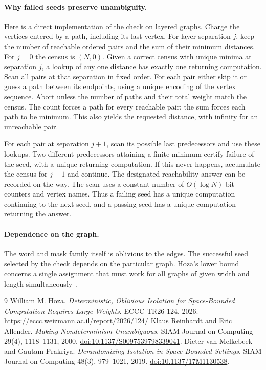 \documentclass[11pt]{article}
\begin{document}
\paragraph{Why failed seeds preserve unambiguity.}
Here is a direct implementation of the check on layered graphs. Charge
the vertices entered by a path, including its last vertex. For layer
separation $j$, keep the number of reachable ordered pairs and the sum
of their minimum distances. For $j=0$ the census is $(N,0)$.
Given a correct census with unique minima at separation $j$, a lookup
of any one distance has exactly one returning computation. Scan all
pairs at that separation in fixed order. For each pair either skip it
or guess a path between its endpoints, using a unique encoding of the
vertex sequence. Abort unless the number of paths and their total
weight match the census. The count forces a path for every reachable
pair; the sum forces each path to be minimum. This also yields the
requested distance, with infinity for an unreachable pair.

For each pair at separation $j+1$, scan its possible last predecessors
and use these lookups. Two different predecessors attaining a finite
minimum certify failure of the seed, with a unique returning computation.
If this never happens, accumulate the census for $j+1$ and continue.
The designated reachability answer can be recorded on the way. The scan
uses a constant number of $O(\log N)$-bit counters and vertex names.
Thus a failing seed has a unique computation continuing to the next seed,
and a passing seed has a unique computation returning the answer.

\paragraph{Dependence on the graph.}
The word and mask family itself is oblivious to the edges. The successful
seed selected by the check depends on the particular graph. Hoza's
lower bound concerns a single assignment that must work for all graphs
of given width and length simultaneously~\cite{Hoza}.

\begin{thebibliography}{9}
 William M. Hoza. \emph{Deterministic, Oblivious Isolation for
Space-Bounded Computation Requires Large Weights}. ECCC TR26-124, 2026.
\url{https://eccc.weizmann.ac.il/report/2026/124/}
 Klaus Reinhardt and Eric Allender. \emph{Making Nondeterminism
Unambiguous}. SIAM Journal on Computing 29(4), 1118--1131, 2000.
\href{https://doi.org/10.1137/S0097539798339041}{doi:10.1137/S0097539798339041}.
 Dieter van Melkebeek and Gautam Prakriya. \emph{Derandomizing
Isolation in Space-Bounded Settings}. SIAM Journal on Computing 48(3),
979--1021, 2019.
\href{https://doi.org/10.1137/17M1130538}{doi:10.1137/17M1130538}.
\end{thebibliography}
\end{document}
